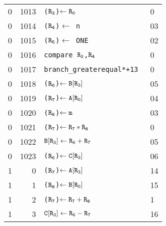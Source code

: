 \documentclass[12pt,letterpaper]{article}
\begin{document}
\begin{tabular}{r|r|l|l}
0 & 1013 & \tt ($\tt R_3$)$\tt \leftarrow R_0$ & 0\\%
0 & 1014 & \tt ($\tt R_4$)$\leftarrow$ n & 03\\%
0 & 1015 & \tt ($\tt R_5$)$\leftarrow$ ONE & 02\\%
0 & 1016 & \tt compare $\tt R_3$,$\tt R_4$ & 0\\
0 & 1017 & \tt branch\_greaterequal*+13 & 0\\%
0 & 1018 & \tt ($\tt R_6$)$\tt \leftarrow B[R_3]$ & 05\\%
0 & 1019 & \tt ($\tt R_7$)$\tt \leftarrow A[R_0]$ & 04\\%
0 & 1020 & \tt ($\tt R_8$)$\tt \leftarrow m$ & 03\\%
0 & 1021 & \tt ($\tt R_7$)$\tt \leftarrow R_7*R_8$ & 0\\%
0 & 1022 & $\tt B[R_3]\leftarrow R_6+R_7$ & 05\\%
0 & 1023 & \tt ($\tt R_6$)$\tt \leftarrow C[R_3]$ & 06\\%
1 & 0 & \tt ($\tt R_7$)$\tt \leftarrow A[R_3]$ & 14\\%
1 & 1 & \tt ($\tt R_8$)$\tt \leftarrow B[R_0]$ & 15\\%
1 & 2 & \tt ($\tt R_7$)$\tt \leftarrow R_7+R_8$ & 1\\%
1 & 3 & $\tt C[R_3] \leftarrow R_6-R_7$ & 16\\%
\end{tabular}
\end{document}
